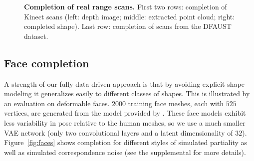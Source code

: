 \begin{figure}
\centering
{}
\newline
{}
\caption{\textbf{Completion of real range scans.} First two rows: completion of Kinect scans (left: depth image; middle: extracted point cloud; right: completed shape). Last row: completion of scans from the DFAUST dataset.
\vspace{-2mm}
} 
\label{fig:err_real_data}
\end{figure} 

\subsection{Face completion}
\label{sec:facecompletion}
A strength of our fully data-driven approach is that by avoiding explicit shape modeling it generalizes easily to different classes of shapes. This is illustrated by an evaluation on deformable faces. $2000$ training face meshes, each with $525$ vertices, are generated from the model provided by \cite{gerig2017morphable}. These face models exhibit less variability in pose relative to the human meshes, so we use a much smaller VAE network (only two convolutional layers and a latent dimensionality of $32$). Figure~\ref{fig:faces} shows completion for different styles of simulated partiality as well as simulated correspondence noise (see the supplemental for more details).

